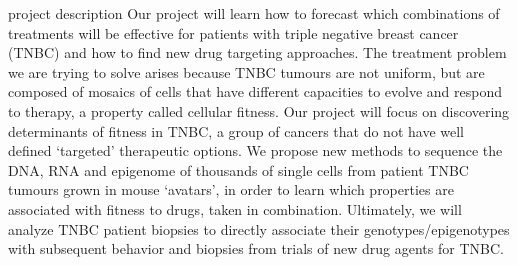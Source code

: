 project description
Our project will learn how to forecast which combinations of treatments will be effective for patients with triple
negative breast cancer (TNBC) and how to find new drug targeting approaches. The treatment problem we are
trying to solve arises because TNBC tumours are not uniform, but are composed of mosaics of cells that have
different capacities to evolve and respond to therapy, a property called cellular fitness. Our project will focus on
discovering determinants of fitness in TNBC, a group of cancers that do not have well defined `targeted'
therapeutic options. We propose new methods to sequence the DNA, RNA and epigenome of thousands of single
cells from patient TNBC tumours grown in mouse `avatars', in order to learn which properties are associated with
fitness to drugs, taken in combination. Ultimately, we will analyze TNBC patient biopsies to directly associate their
genotypes/epigenotypes with subsequent behavior and biopsies from trials of new drug agents for TNBC.


